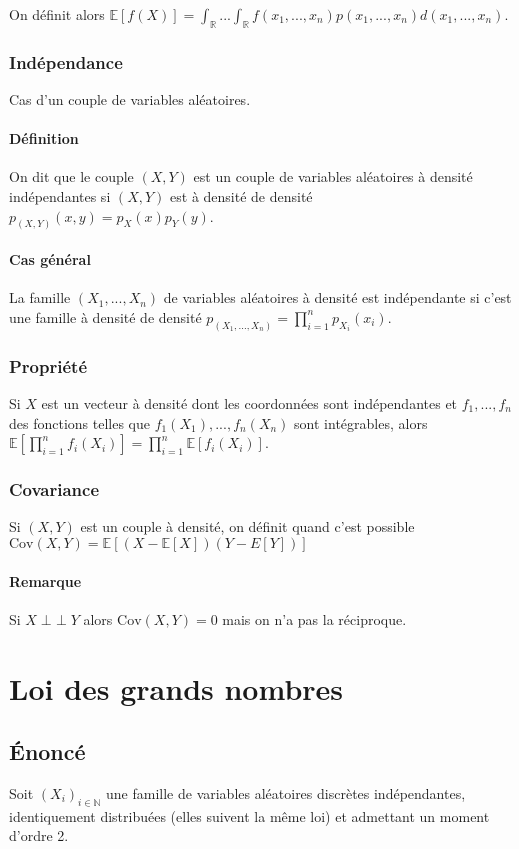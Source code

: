 \documentclass[a4paper,10pt]{book} %
\newcommand{\R}{\mathbb{R}}
\newcommand{\N}{\mathbb{N}}
\newcommand{\E}{\mathbb{E}} %
\newcommand{\Cov}{\mathrm{Cov}} %
\DeclareMathOperator{\ind}{\perp \!\!\! \perp}
\begin{document}
On définit alors $\E[f(X)] = \int_\R...\int_\R f(x_1,...,x_n)p(x_1,...,x_n)d(x_1,...,x_n)$.

\subsection{Indépendance}
Cas d'un couple de variables aléatoires.

\subsubsection{Définition}
On dit que le couple $(X,Y)$ est un couple de variables aléatoires à densité indépendantes si $(X,Y)$ est à densité de densité $p_{(X,Y)}(x,y)=p_X(x)p_Y(y)$.

\subsubsection{Cas général}
La famille $(X_1,...,X_n)$ de variables aléatoires à densité est indépendante si c'est une famille à densité de densité $\displaystyle p_{(X_1,...,X_n)}=\prod_{i=1}^{n}p_{X_i}(x_i)$.

\subsection{Propriété}
Si $X$ est un vecteur à densité dont les coordonnées sont indépendantes et $f_1,...,f_n$ des fonctions telles que $f_1(X_1),...,f_n(X_n)$ sont intégrables, alors $\displaystyle \E[\prod_{i=1}^{n}f_i(X_i)] = \prod_{i=1}^{n}\E[f_i(X_i)]$.

\subsection{Covariance}
Si $(X,Y)$ est un couple à densité, on définit quand c'est possible\\
$\Cov(X,Y) = \E[(X-\E[X])(Y-E[Y])]$

\subsubsection{Remarque}
Si $X\ind Y$ alors $\Cov(X,Y) = 0$ mais on n'a pas la réciproque.


\chapter*{Loi des grands nombres}
\section*{Énoncé}
Soit $(X_i)_{i\in\N}$ une famille de variables aléatoires discrètes indépendantes, identiquement distribuées (elles suivent la même loi) et admettant un moment d'ordre 2.\\
\end{document}
